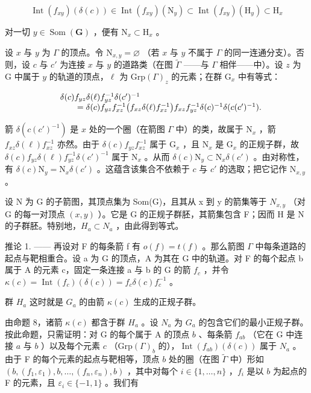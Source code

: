 \[
\operatorname{Int} (f _ {x y}) (\delta (c)) \in \operatorname{Int} (f _ {x y}) (\mathrm{N} _ {y}) \subset \operatorname{Int} (f _ {x y}) (\mathrm{H} _ {y}) \subset \mathrm{H} _ {x}
\]

对一切 \(y \in \operatorname{Som}(\mathbf{G})\) ，便有 \(\mathrm{N}_x \subset \mathrm{H}_x\) 。

设 \(x\) 与 \(y\) 为 \(\Gamma\) 的顶点。令 \(\mathrm{N}_{x,y} = \varnothing\) （若 \(x\) 与 \(y\) 不属于 \(\Gamma\) 的同一连通分支）。否则，设 \(c\) 与 \(c'\) 为连接 \(x\) 与 \(y\) 的道路类（在图 \(\widetilde{\Gamma}\) ——与 \(\Gamma\) 相伴——中）。设 \(z\) 为 G 中属于 \(y\) 的轨道的顶点，\(\ell\) 为 \(\mathrm{Grp}(\Gamma)_z\) 的元素；在群 \(\mathrm{G}_x\) 中有等式：

\[
\begin{array}{r l} & {\delta (c) f _ {y z} \delta (\ell) f _ {y z} ^ {- 1} \delta (c ^ {\prime}) ^ {- 1}} \\ & {\qquad = \delta (c) f _ {y z} f _ {x z} ^ {- 1} \big (f _ {x z} \delta (\ell) f _ {x z} ^ {- 1} \big) f _ {x z} f _ {y z} ^ {- 1} \delta (c) ^ {- 1} \delta (c (c ^ {\prime}) ^ {- 1}).} \end{array}
\]

箭 \(\delta(c(c')^{-1})\) 是 \(x\) 处的一个圈（在箭图 \(\Gamma\) 中）的类，故属于 \(\mathrm{N}_x\) ，箭 \(f_{xz}\delta(\ell)f_{xz}^{-1}\) 亦然。由于 \(\delta(c)f_{yz}f_{xz}^{-1}\) 属于 \(\mathrm{G}_x\) ，且 \(\mathrm{N}_x\) 是 \(\mathrm{G}_x\) 的正规子群，故 \(\delta(c)f_{yz}\delta(\ell)f_{yz}^{-1}\delta(c')^{-1}\) 属于 \(\mathrm{N}_x\) 。从而 \(\delta(c)\mathrm{N}_y\subset \mathrm{N}_x\delta(c')\) 。由对称性，有 \(\delta(c)\mathrm{N}_y = \mathrm{N}_x\delta(c')\) 。这蕴含该集合不依赖于 \(c\) 与 \(c'\) 的选取；把它记作 \(\mathrm{N}_{x,y}\) 。

设 N 为 G 的子箭图，其顶点集为 Som(G)，且其从 x 到 y 的箭集等于 \(N_{x,y}\) （对 G 的每一对顶点 \((x,y)\) ）。它是 G 的正规子群胚，其箭集包含 F；因而 H 是 N 的子群胚。特别地，\(H_{a} \subset N_{a}\) ，由此得到等式。

推论 1. —— 再设对 F 的每条箭 f 有 \(o(f) = t(f)\) 。那么箭图 \(\Gamma\) 中每条道路的起点与靶相重合。设 a 为 G 的顶点，A 为其在 G 中的轨道。对 F 的每个起点 b 属于 A 的元素 c，固定一条连接 a 与 b 的 G 的箭 \(f_{c}\) ，并令 \(\kappa(c) = \operatorname{Int}(f_{c})(\delta(c)) = f_{c}\delta(c)f_{c}^{-1}\) 。

群 \(H_{a}\) 这时就是 \(G_{a}\) 的由箭 \(\kappa(c)\) 生成的正规子群。

由命题 8，诸箭 \(\kappa(c)\) 都含于群 \(H_a\) 。设 \(N_a\) 为 \(G_a\) 的包含它们的最小正规子群。按此命题，只需证明：对 G 的每个属于 A 的顶点 \(b\) 、每条箭 \(f_{ab}\) （它在 G 中连接 \(a\) 与 \(b\) ）以及每个元素 \(c\) （\(\mathrm{Grp}(\Gamma)_b\) 的），\(\operatorname{Int}(f_{ab})(\delta(c))\) 属于 \(N_a\) 。由于 F 的每个元素的起点与靶相等，顶点 \(b\) 处的圈（在图 \(\widetilde{\Gamma}\) 中）形如 \((b,(f_1,\varepsilon_1),b,\ldots,(f_n,\varepsilon_n),b)\) ，其中对每个 \(i\in\{1,\ldots,n\}\) ，\(f_i\) 是以 \(b\) 为起点的 F 的元素，且 \(\varepsilon_i\in\{-1,1\}\) 。我们有

